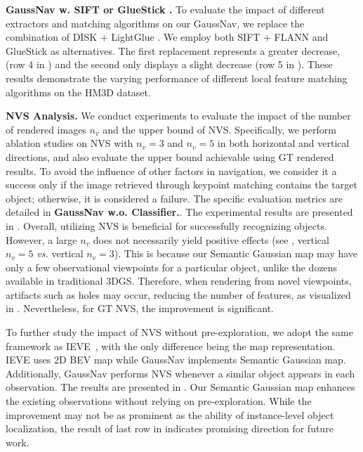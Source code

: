 \textbf{GaussNav w. SIFT or GlueStick \cite{pautrat_suarez_2023_gluestick}.} To evaluate the impact of different extractors and matching algorithms on our GaussNav, we replace the combination of DISK \cite{tyszkiewicz2020disk} + LightGlue \cite{lindenberger2023lightglue}. We employ both SIFT + FLANN and GlueStick \cite{pautrat_suarez_2023_gluestick} as alternatives. The first replacement represents a greater decrease, (row 4 in ) and the second only displays a slight decrease (row 5 in ). These results demonstrate the varying performance of different local feature matching algorithms on the HM3D dataset.

\textbf{NVS Analysis.} We conduct experiments to evaluate the impact of the number of rendered images $n_v$ and the upper bound of NVS. Specifically, we perform ablation studies on NVS with $n_v=3$ and $n_v=5$ in both horizontal and vertical directions, and also evaluate the upper bound achievable using GT rendered results. To avoid the influence of other factors in navigation, we consider it a success only if the image retrieved through keypoint matching contains the target object; otherwise, it is considered a failure. The specific evaluation metrics are detailed in \textbf{GaussNav w.o. Classifier.}. The experimental results are presented in . Overall, utilizing NVS is beneficial for successfully recognizing objects. However, a large $n_v$ does not necessarily yield positive effects (see , vertical $n_v=5$ \textit{vs.} vertical $n_v=3$). This is because our Semantic Gaussian map may have only a few observational viewpoints for a particular object, unlike the dozens available in traditional 3DGS. Therefore, when rendering from novel viewpoints, artifacts such as holes may occur, reducing the number of features, as visualized in . Nevertheless, for GT NVS, the improvement is significant.



To further study the impact of NVS without pre-exploration, we adopt the same framework as IEVE~\cite{lei2024instanceaware}, with the only difference being the map representation. IEVE uses 2D BEV map while GaussNav implements Semantic Gaussian map. Additionally, GaussNav performs NVS whenever a similar object appears in each observation. The results are presented in . Our Semantic Gaussian map enhances the existing observations without relying on pre-exploration. While the improvement may not be as prominent as the ability of instance-level object localization, the result of last row in  indicates promising direction for future work.

